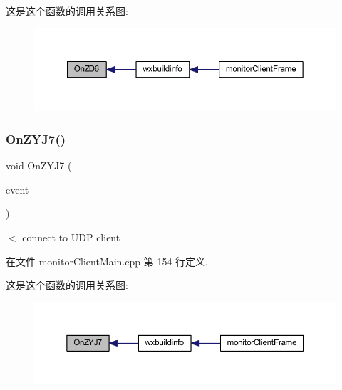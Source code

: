 这是这个函数的调用关系图\+:\nopagebreak
\begin{figure}[H]
\begin{center}
\leavevmode
\includegraphics[width=350pt]{classmonitor_client_frame_a9ceeffc68f5f33c6fd97bba9bfbea284_icgraph}
\end{center}
\end{figure}
\mbox{\label{classmonitor_client_frame_a77801fb08b609cf2a5521906f1ced65f}} 
\subsubsection{\texorpdfstring{On\+Z\+Y\+J7()}{OnZYJ7()}}
{\footnotesize\ttfamily void On\+Z\+Y\+J7 (\begin{DoxyParamCaption}\item[{wx\+Command\+Event \&}]{event }\end{DoxyParamCaption})\hspace{0.3cm}{\ttfamily [private]}}

$<$ connect to U\+DP client 

在文件 monitor\+Client\+Main.\+cpp 第 154 行定义.

这是这个函数的调用关系图\+:\nopagebreak
\begin{figure}[H]
\begin{center}
\leavevmode
\includegraphics[width=350pt]{classmonitor_client_frame_a77801fb08b609cf2a5521906f1ced65f_icgraph}
\end{center}
\end{figure}
\mbox{\label{classmonitor_client_frame_ad67e14332e85cc8058e45d73778d6491}} 
